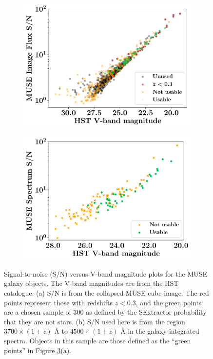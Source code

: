\documentclass[12pt, twocolumn]{revtex4}    %
\begin{document}
\begin{figure}
  \begin{subfigure}[b]{0.495\textwidth}
    \includegraphics[width=\textwidth]{data/image_sn_vs_vband}
    \captionsetup{justification=justified}
    \label{fig:image_sn_vband}
  \end{subfigure}
  \begin{subfigure}[b]{0.495\textwidth}
    \includegraphics[width=\textwidth]{data/sn_vs_vband}
    \captionsetup{justification=justified}    
    \label{fig:spec_sn_vband}
  \end{subfigure}
  \captionsetup{justification=justified}
  \caption[HUDF Objects]{Signal-to-noise (S/N) versus V-band magnitude plots for the MUSE galaxy objects. The V-band magnitudes are from the HST catalogue. (a) S/N is from the collapsed MUSE cube image. The red points represent those with redshifts $z<0.3$, and the green points are a chosen sample of 300 as defined by the SExtractor probability that they are not stars. (b) S/N used here is from the region $3700\times(1+z)$ {\AA} to $4500\times(1+z)$ {\AA} in the galaxy integrated spectra. Objects in this sample are those defined as the ``green points'' in Figure \ref{fig:sn_vband}(a).}
  \label{fig:sn_vband}
\end{figure}
\end{document}
